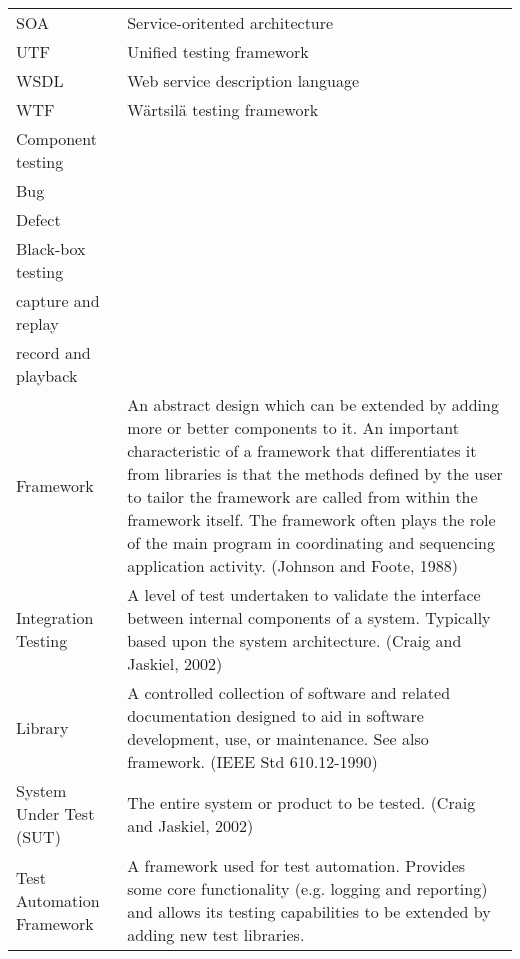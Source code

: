 \documentclass[12pt,a4paper,oneside,pdftex]{report}
\begin{document}
\noindent
\begin{longtable}{@{}p{}p{}@{}}
SOA & Service-oritented architecture \\
UTF & Unified testing framework \\
WSDL & Web service description language \\
WTF & Wärtsilä testing framework \\
Component testing & \\
Bug & \\
Defect & \\
Black-box testing & \\
capture and replay & \\
record and playback & \\
Framework & An abstract design which can be extended by adding more or better components to it. An important characteristic of a framework that differentiates it from libraries is that the methods defined by the user to tailor the framework are called from within the framework itself. The framework often plays the role of the main program in coordinating and sequencing application activity. (Johnson and Foote, 1988) \\
Integration Testing & A level of test undertaken to validate the interface between internal components of a system. Typically based upon the system architecture. (Craig and Jaskiel, 2002) \\
Library & A controlled collection of software and related documentation designed to aid in software development, use, or maintenance. See also framework. (IEEE Std 610.12-1990) \\
System Under Test (SUT) & The entire system or product to be tested. (Craig and Jaskiel, 2002) \\
Test Automation Framework & A framework used for test automation. Provides some core functionality (e.g. logging and reporting) and allows its testing capabilities to be extended by adding new test libraries. \\


\end{longtable}


\cleardoublepage
\tableofcontents
\end{document}
